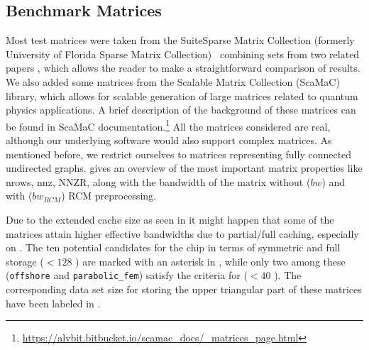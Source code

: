 \subsection{Benchmark Matrices}
\label{subsec:bench_mat}
Most test matrices were taken from the Suite\-Sparse Matrix Collection (formerly University of Florida Sparse Matrix Collection)~\cite{UOF} combining sets from two related papers \cite{RSB,park_ls}, which allows the reader to make a straightforward comparison of results.  We also added some matrices from the Scalable Matrix Collection (ScaMaC) library\cite{ScaMaC}, which allows for scalable generation of large matrices related to quantum physics applications. A brief description of the background of these matrices can be found in ScaMaC documentation.\footnote{\href{https://alvbit.bitbucket.io/scamac_docs/_matrices_page.html}{https://alvbit.bitbucket.io/scamac\_docs/\_matrices\_page.html}} All the matrices considered are real, although our underlying software would also support complex matrices.
As mentioned before, we restrict ourselves to matrices representing fully connected undirected graphs.
 gives an overview of the most important matrix properties like \acrfull{nrows}, \acrfull{nnz}, \acrfull{NNZR}, along with the bandwidth of the matrix without ($bw$) and with ($bw_{RCM}$) \acrshort{RCM} preprocessing. 

Due to the extended cache size as seen in  it
might happen that some of the matrices attain higher effective
bandwidths due to partial/full caching, especially on \SKX. The ten potential candidates
for the \SKX chip in terms of symmetric and full storage ($< 128$ \MB)
are marked with an asterisk in , while only
two among these (\texttt{offshore} and \texttt{parabolic\_fem}) 
satisfy the criteria for \IVB ($< 40$ \MB). The corresponding data set
size for storing the upper triangular part of these matrices have been
labeled in .

